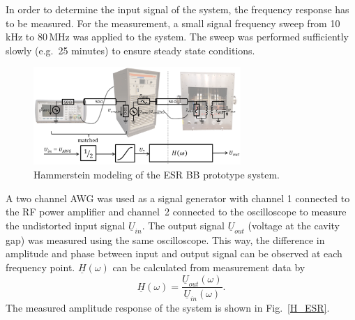 \documentclass[a4paper,
              ]{jacow}
\begin{document}
	
	In order to determine the input signal of the system, the frequency response has to be measured. %
	For the measurement, a small signal frequency sweep from 10\,kHz to 80\,MHz was applied to the system. The sweep was performed sufficiently slowly
	(e.g.~25 minutes) to ensure steady state conditions. 
	
	\begin{figure}[!tbh]
	\centering
	\includegraphics*[width=0.7\textwidth]{WEPVA047f2.eps}
	\caption{Hammerstein modeling of the ESR BB prototype system.}
	\label{Modellierung}
	\end{figure}
	
	A two channel AWG was used as a signal generator with channel 1	connected to the RF power amplifier and channel~2 connected to the oscilloscope to measure 
	the undistorted input signal $\underline{U}_{in}$. The output signal $\underline{U}_{out}$ (voltage at the cavity gap) was measured using the 
	same oscilloscope. This way, the difference in amplitude and phase between input and output signal can be observed at each frequency point. 
	$\underline{H}(\omega)$ can be calculated from measurement data
	by
	\begin{equation}
	 \underline{H}(\omega)=\frac{\underline{U}_{out}(\omega)}{\underline{U}_{in}(\omega)}.
	\end{equation}
	The measured amplitude response of the system is shown in Fig.~\ref{H_ESR}.
	
\end{document}
